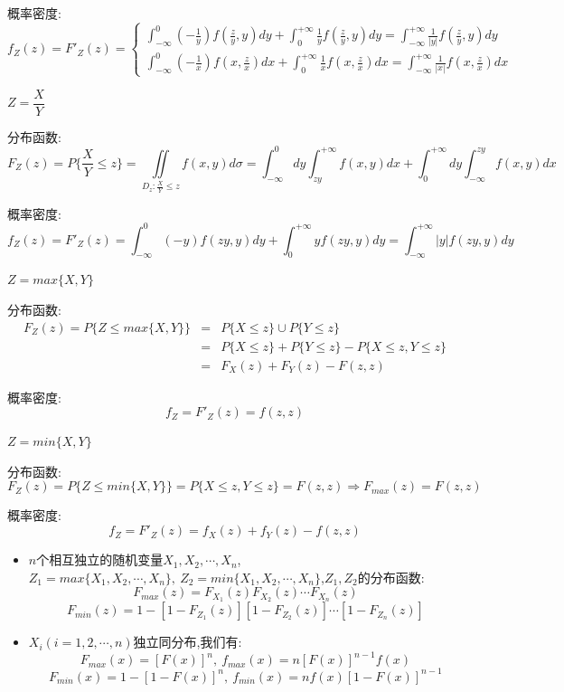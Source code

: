 \begin{definition}[连续型多维随机变量函数的分布]
	概率密度: 
	$$f_{Z}(z)=F'_{Z}(z)=\left\lbrace 
	\begin{array}{l}
		\int_{-\infty}^{0}(-\frac{1}{y})f(\frac{z}{y},y)dy+\int_{0}^{+\infty}\frac{1}{y}f(\frac{z}{y},y)dy=\int_{-\infty}^{+\infty}\frac{1}{|y|}f(\frac{z}{y},y)dy\\
		\int_{-\infty}^{0}(-\frac{1}{x})f(x,\frac{z}{x})dx+\int_{0}^{+\infty}\frac{1}{x}f(x,\frac{z}{x})dx=\int_{-\infty}^{+\infty}\frac{1}{|x|}f(x,\frac{z}{x})dx
	\end{array}
	\right. $$
	
	\begin{figure}[H]
		\centering  %
	\end{figure}
	$Z=\dfrac{X}{Y}$
	
	分布函数: 
	$$F_{Z}(z)=P\{\dfrac{X}{Y}\leq z\}=\iint\limits_{D_{z}:\frac{X}{Y}\leq z}f(x,y)d\sigma=\int_{-\infty}^{0}dy\int_{zy}^{+\infty}f(x,y)dx+\int_{0}^{+\infty}dy\int_{-\infty}^{zy}f(x,y)dx$$
	
	概率密度: 
	$$f_{Z}(z)=F'_{Z}(z)=\int_{-\infty}^{0}(-y)f(zy,y)dy+\int_{0}^{+\infty}yf(zy,y)dy=\int_{-\infty}^{+\infty}|y|f(zy,y)dy$$
	
	
	$Z=max\{X,Y\}$
	
	分布函数: 
	\begin{eqnarray*}
		F_{Z}(z)=P\{Z\leq max\{X,Y\}\}&=&P\{X\leq z\}\cup P\{Y\leq z\}\\
		&=&P\{X\leq z\}+P\{Y\leq z\}-P\{X\leq z,Y\leq z\}\\
		&=&F_{X}(z)+F_{Y}(z)-F(z,z)
	\end{eqnarray*}

	
	概率密度: 
	$$f_{Z}=F'_{Z}(z)=f(z,z)$$
	
	
	$Z=min\{X,Y\}$
	
	分布函数: 
	$$F_{Z}(z)=P\{Z\leq min\{X,Y\}\}=P\{X\leq z,Y\leq z\}=F(z,z)\Rightarrow F_{max}(z)=F(z,z)$$
	
	概率密度: 
	$$f_{Z}=F'_{Z}(z)=f_{X}(z)+f_{Y}(z)-f(z,z)$$
	\begin{anymark}[注]
		\begin{itemize}
			\item  $n$个相互独立的随机变量$X_{1},X_{2},\cdots,X_{n}$,$Z_{1}=max\{X_{1},X_{2},\cdots,X_{n}\},\ Z_{2}=min\{X_{1},X_{2},\cdots,X_{n}\}$,$Z_{1},Z_{2}$的分布函数: 
			$$F_{max}(z)=F_{X_{1}}(z)F_{X_{2}}(z)\cdots F_{X_{n}}(z)$$
			$$F_{min}(z)=1-[1-F_{Z_{1}}(z)][1-F_{Z_{2}}(z)]\cdots[1-F_{Z_{n}}(z)]              $$
			\item $X_{i}(i=1,2,\cdots,n)$独立同分布,我们有: 
			$$F_{max}(x)=[F(x)]^n,\ f_{max}(x)=n[F(x)]^{n-1}f(x)$$
			$$F_{min}(x)=1-[1-F(x)]^n,\ f_{min}(x)=nf(x)[1-F(x)]^{n-1}$$
		\end{itemize}
	\end{anymark}
\end{definition}
